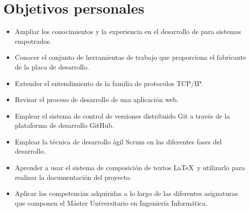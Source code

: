 \section{Objetivos personales}\label{sec:obj_personales}
\begin{itemize}
  \item Ampliar los conocimientos y la experiencia en el desarrollo de
   para sistemas empotrados.
  \item Conocer el conjunto de herramientas de trabajo que proporciona el
  fabricante de la placa de desarrollo.
  \item Extender el entendimiento de la familia de protocolos TCP/IP.
  \item Revisar el proceso de desarrollo de una aplicación web.
  \item Emplear el sistema de control de versiones distribuido Git a través
  de la plataforma de desarrollo GitHub.
  \item Emplear la técnica de desarrollo ágil Scrum en las diferentes fases del
  desarrollo.
  \item Aprender a usar el sistema de composición de textos \LaTeX\ y utilizarlo
  para realizar la documentación del proyecto.
  \item Aplicar las competencias adquiridas a lo largo de las diferentes
  asignaturas que componen el Máster Universitario en Ingeniería Informática.
\end{itemize}
